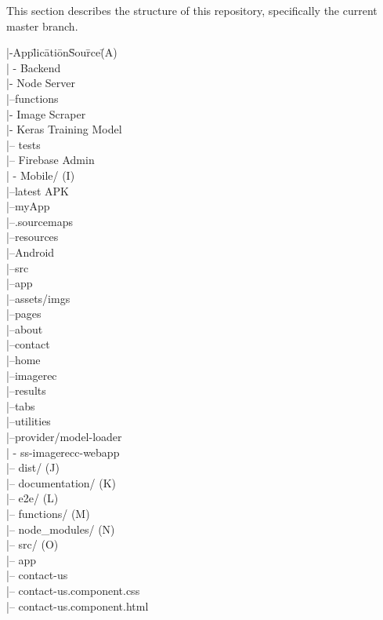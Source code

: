 \documentclass[a4paper, 11pt]{article}
\begin{document}
This section describes the structure of this repository, specifically the current master branch.

\begin{tabbing}
	
|-App\=lic\=ati\=on\=Sou\=rce\= (A)\\
\>| -  Backend\\
\>\>|- Node Server\\
\> \> \> |--functions\\
\>\>|- Image Scraper\\
\>\>|- Keras Training Model\\
\> \> \> |-- tests\\
\> \>|-- Firebase Admin \\

\>| - Mobile/ (I)\\
\>\>|--latest APK\\
\>\>|--myApp\\
\>\>\>|--.sourcemaps\\
\>\>\>|--resources\\
\>\>\>\>\>|--Android\\
\>\>\>|--src\\
\>\>\>\>\>|--app\\
\>\>\>\>\>|--assets/imgs\\
\>\>\>\>\>|--pages\\
\>\>\>\>\>\>|--about\\
\>\>\>\>\>\>|--contact\\
\>\>\>\>\>\>|--home\\
\>\>\>\>\>\>|--imagerec\\
\>\>\>\>\>\>|--results\\
\>\>\>\>\>\>|--tabs\\
\>\>\>\>\>\>|--utilities\\
\>\>\>\>\>|--provider/model-loader\\
\>| - ss-imagerecc-webapp\\
\>\>|-- dist/ (J)\\
\>\>|-- documentation/ (K)\\
\>\>|-- e2e/ (L)\\
\>\>|-- functions/ (M)\\
\>\>|-- node\_modules/ (N)\\
\>\>|-- src/ (O)\\
\>\>\>|-- app\\
\>\>\>\>\>|-- contact-us\\
\>\>\>\>\>\>|-- contact-us.component.css\\
\>\>\>\>\>\>|-- contact-us.component.html\\

\end{tabbing}
\end{document}
